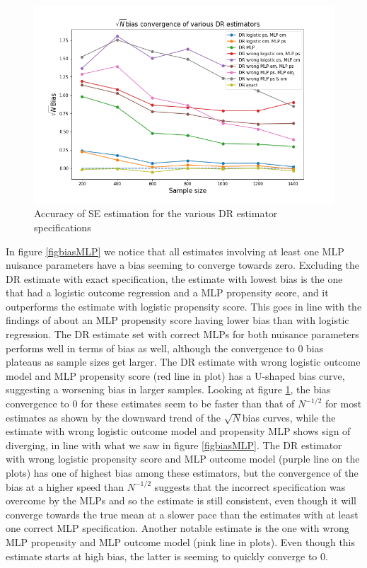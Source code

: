 \documentclass[12pt,twoside]{article}
\begin{document}
\begin{figure}[h!]
    \centering
    \includegraphics[width = 0.9\columnwidth]{figures/sqrtnMLP.png}
    \caption{Accuracy of \citet{lunceford_davidian} SE estimation for the various DR estimator specifications}
    \label{figsqrtnMLP}
\end{figure}

In figure \ref{figbiasMLP} we notice that all estimates involving at least one MLP nuisance parameters have a bias seeming to converge towards zero. Excluding the DR estimate with exact specification, the estimate with lowest bias is the one that had a logistic outcome regression and a MLP propensity score, and it outperforms the estimate with logistic propensity score. This goes in line with the findings of \citet{setoguchi-nn} about an MLP propensity score having lower bias than with logistic regression. The DR estimate set with correct MLPs for both nuisance parameters performs well in terms of bias as well, although the convergence to 0 bias plateaus as sample sizes get larger. The DR estimate with wrong logistic outcome model and MLP propensity score (red line in plot) has a U-shaped bias curve, suggesting a worsening bias in larger samples. Looking at figure \ref{figsqrtnMLP}, the bias convergence to 0 for these estimates seem to be faster than that of $N^{-1/2}$ for most estimates as shown by the downward trend of the $\sqrt{N}$bias curves, while the estimate with wrong logistic outcome model and propensity MLP shows sign of diverging, in line with what we saw in figure \ref{figbiasMLP}. The DR estimator with wrong logistic propensity score and MLP outcome model (purple line on the plots) has one of highest bias among these estimators, but the convergence of the bias at a higher speed than $N^{-1/2}$ suggests that the incorrect specification was overcome by the MLPs and so the estimate is still consistent, even though it will converge towards the true mean at a slower pace than the estimates with at least one correct MLP specification. Another notable estimate is the one with wrong MLP propensity and MLP outcome model (pink line in plots). Even though this estimate starts at high bias, the latter is seeming to quickly converge to 0.
\end{document}
